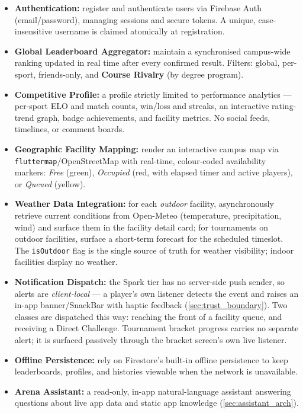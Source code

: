 \documentclass{configurations/polimi3i_thesis}
\renewcommand{\_}{\textunderscore\allowbreak}
\begin{document}
\begin{itemize}
    \item \textbf{Authentication:} register and authenticate users via Firebase Auth (email/password), managing sessions and secure tokens. A unique, case-insensitive username is claimed atomically at registration.
    \item \textbf{Global Leaderboard Aggregator:} maintain a synchronised campus-wide ranking updated in real time after every confirmed result. Filters: global, per-sport, friends-only, and \textbf{Course Rivalry} (by degree program).
    \item \textbf{Competitive Profile:} a profile strictly limited to performance analytics — per-sport ELO and match counts, win/loss and streaks, an interactive rating-trend graph, badge achievements, and facility metrics. No social feeds, timelines, or comment boards.
    \item \textbf{Geographic Facility Mapping:} render an interactive campus map via \texttt{flutter\_map}\slash\allowbreak OpenStreetMap with real-time, colour-coded availability markers: \emph{Free} (green), \emph{Occupied} (red, with elapsed timer and active players), or \emph{Queued} (yellow).
    \item \textbf{Weather Data Integration:} for each \emph{outdoor} facility, asynchronously retrieve current conditions from Open-Meteo (temperature, precipitation, wind) and surface them in the facility detail card; for tournaments on outdoor facilities, surface a short-term forecast for the scheduled timeslot. The \texttt{isOutdoor} flag is the single source of truth for weather visibility; indoor facilities display no weather.
    \item \textbf{Notification Dispatch:} the Spark tier has no server-side push sender, so alerts are \emph{client-local} — a player's own listener detects the event and raises an in-app banner/SnackBar with haptic feedback (\cref{sec:trust_boundary}). Two classes are dispatched this way: reaching the front of a facility queue, and receiving a Direct Challenge. Tournament bracket progress carries no separate alert; it is surfaced passively through the bracket screen's own live listener.
    \item \textbf{Offline Persistence:} rely on Firestore's built-in offline persistence to keep leaderboards, profiles, and histories viewable when the network is unavailable.
    \item \textbf{Arena Assistant:} a read-only, in-app natural-language assistant answering questions about live app data and static app knowledge (\cref{sec:assistant_arch}).
\end{itemize}
\end{document}
